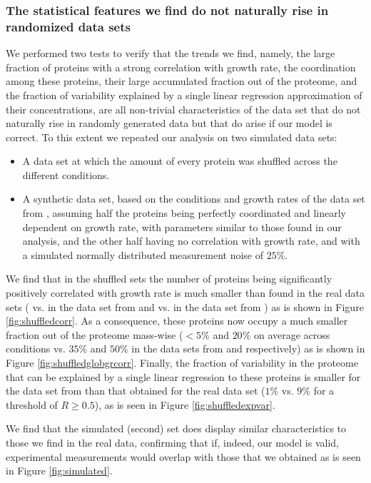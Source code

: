 \subsubsection{The statistical features we find do not naturally rise in randomized data sets}
\label{randanalysis}
We performed two tests to verify that the trends we find, namely, the large fraction of proteins with a strong correlation with growth rate, the coordination among these proteins, their large accumulated fraction out of the proteome, and the fraction of variability explained by a single linear regression approximation of their concentrations, are all non-trivial characteristics of the data set that do not naturally rise in randomly generated data but that do arise if our model is correct.
To this extent we repeated our analysis on two simulated data sets:
\begin{itemize}
\item A data set at which the amount of every protein was shuffled across the different conditions.
\item A synthetic data set, based on the conditions and growth rates of the data set from \cite{Heinemann2015}, assuming half the proteins being perfectly coordinated and linearly dependent on growth rate, with parameters similar to those found in our analysis, and the other half having no correlation with growth rate, and with a simulated normally distributed measurement noise of $25\%$.
\end{itemize}

We find that in the shuffled sets the number of proteins being significantly positively correlated with
growth rate is much smaller than found in the real data sets (\hGlobalShuff{} vs. \hGlobal{} in the data set from \cite{Heinemann2015} and \vGlobalShuff{} vs. \vGlobal{} in the data set from \cite{Valgepea2013}) as is shown in Figure \ref{fig:shuffledcorr}.
As a consequence, these proteins now occupy a much smaller fraction out of the proteome mass-wise ($<5\%$ and $20\%$ on average across conditions vs. $35\%$ and $50\%$ in the data sets from \cite{Heinemann2015} and \cite{Valgepea2013} respectively) as is shown in Figure \ref{fig:shuffledglobgrcorr}.
Finally, the fraction of variability in the proteome that can be explained by a single linear regression to these proteins is smaller for the data set from \cite{Heinemann2015} than that obtained for the real data set ($1\%$ vs. $9\%$ for a threshold of $R\ge0.5$), as is seen in Figure \ref{fig:shuffledexpvar}.

We find that the simulated (second) set does display similar characteristics to those we find in the real data, confirming that if, indeed, our model is valid, experimental measurements would overlap with those that we obtained as is seen in Figure \ref{fig:simulated}.